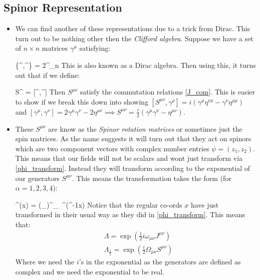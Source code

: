 \documentclass[11pt]{article}
\renewenvironment{flalign}{\vspace{-3mm}\empheq[box=\tcbhighmath]{align}}{\endempheq}
\numberwithin{equation}{section}
\begin{document}
\subsection{Spinor Representation}
\begin{itemize}
  \item We can find another of these representations due to a trick from Dirac. This turn out to be nothing other then the \emph{Clifford algebra}. Suppose  we have a set of $n\times n$ matrices $\gamma^{\mu}$ satisfying: 

  \begin{flalign}
  \label{gamma_def}
    \{\gamma^{\mu},\gamma^{\nu}\} = 2\eta^{\mu\nu}_{n}
  \end{flalign}
  This is also known as a Dirac algebra. Then using this, it turns out that if we define: 

  \begin{flalign}
  \label{S_def}
    S^{\mu\nu} = [\gamma^{\mu},\gamma^{\nu}]
  \end{flalign}
  Then $S^{\mu\nu}$ satisfy the commutation relations \ref{J_com}.  This is easier to show if we break this down into showing $[S^{\mu\nu},\gamma^{\rho}] = i(\gamma^{\mu}\eta^{\nu\rho}-\gamma^{\nu}\eta^{\rho\mu})$ and $[\gamma^{\mu},\gamma^{\nu}] = 2\gamma^{\mu}\gamma^{\nu}-2\eta^{\mu\nu} \implies S^{\mu\nu} = \frac{i}{2}(\gamma^{\mu}\gamma^{\nu}-\eta^{\mu\nu})$. 

  \item These $S^{\mu\nu}$ are know as the \emph{Spinor rotation matrices} or sometimes just the spin matrices. As the name suggests it will turn out that they act on spinors which are two component vectors with complex number entries $\psi = (z_{1},z_2)$. This means that our fields will not be scalars and wont just transform via \ref{phi_transform}. Instead they will transform according to the exponential of our generators $S^{\mu\nu}$. This means the transformation takes the form (for $\alpha=1,2,3,4$):

  \begin{flalign}
    \label{S_transform}
    \psi^{\alpha}(x) = (\Lambda_{})^{\alpha}_{~\beta}\psi^{\beta}(\Lambda^{-1}x)
  \end{flalign}
  Notice that the regular co-ords $x$ have just transformed in their usual way as they did in \ref{phi_transform}. This means that:
  \begin{align}
     &\Lambda = \exp(\frac{1}{2}i\omega_{\mu\nu}J^{\mu\nu}) \nonumber \\
     \label{L_half}
     & \Lambda_{\frac{1}{2}} = \exp(\frac{i}{2}\Omega_{\mu\nu}S^{\mu\nu})
   \end{align} 
   Where we need the $i$'s in the exponential as the generators are defined as complex and we need the exponential to be real. 
\end{itemize}
\end{document}
